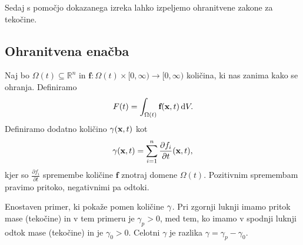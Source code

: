 \documentclass[mat2, tisk]{fmfdelo}
\newcommand{\R}{\mathbb R}
\newcommand{\bd}{\textbf}
\begin{document}
Sedaj s pomočjo dokazanega izreka lahko izpeljemo ohranitvene zakone za tekočine.

\subsection{Ohranitvena enačba} 

Naj bo $\Omega(t) \subseteq \R^n$ in $\bd{f}: \Omega(t) \times [0, \infty) \rightarrow [0, \infty)$
količina, ki nas zanima kako se ohranja. Definiramo 
\begin{equation}
F(t) = \int_{\Omega(t)} \bd{f}(\bd{x}, t) \dif V.
\end{equation}
Definiramo dodatno količino $\bd{\text{$\gamma$}}(\bd{x}, t)$ kot 
\begin{equation}
\bd{\text{$\gamma$}}(\bd{x}, t) = \sum_{i=1}^n \frac{\partial f_i}{\partial t}(\bd{x}, t) ,
\end{equation}
kjer so $\frac{\partial f_i}{\partial t}$ spremembe količine $\bd{f}$ znotraj domene $\Omega(t)$.
Pozitivnim spremembam pravimo pritoko, negativnimi pa odtoki.

\begin{primer}
  Enostaven primer, ki pokaže pomen količine $\bd{\text{$\gamma$}}$. Pri zgornji luknji imamo pritok 
  mase (tekočine) in v tem primeru je $\gamma_{p} > 0$, med tem, ko imamo v spodnji luknji odtok
  mase (tekočine) in je $\gamma_{0} > 0$. Celotni $\gamma$ je razlika $\gamma = \gamma_p - \gamma_0$.\\
  \begin{center}
  \end{center}
\end{primer}
\end{document}
